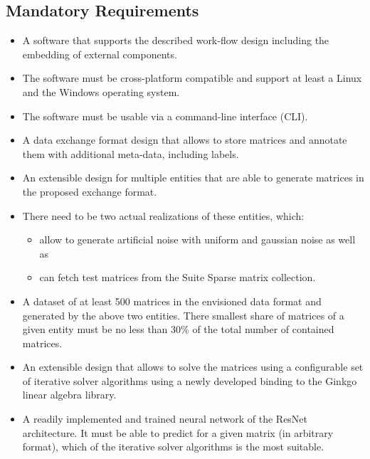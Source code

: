 \documentclass[parskip=full]{scrartcl}
\begin{document}
\subsection{Mandatory Requirements}
\begin{itemize}

\item A software that supports the described work-flow design including the embedding of external components.

\item The software must be cross-platform compatible and support at least a \gls{Linux} and the \gls{Windows} operating system.

\item The software must be usable via a \gls{command-line interface} (CLI).

\item A data exchange format design that allows to store matrices and annotate them with 
additional meta-data, including labels.

\item An extensible design for multiple entities that are able to generate matrices in the proposed exchange format.

\item There need to be two actual realizations of these entities, which:

\begin{itemize}
    \item allow to generate \gls{artificial noise} with uniform and \gls{gaussian noise} as well as
    
    \item can fetch test matrices from the \gls{Suite Sparse} matrix collection.
\end{itemize}

\item A dataset of at least 500 matrices in the envisioned data format and generated by the above two entities. There smallest share of matrices of a given entity must be no less than 30\% of the total number of contained matrices.

\item An extensible design that allows to solve the matrices using a configurable set of \gls{iterative solver} algorithms using a newly developed binding to the \gls{Ginkgo} linear algebra library.

\item A readily implemented and trained \gls{neural network} of the \gls{ResNet} architecture. It must be able to predict for a given matrix (in arbitrary format), which of the \gls{iterative solver} algorithms is the most suitable.


\end{itemize}
\end{document}
